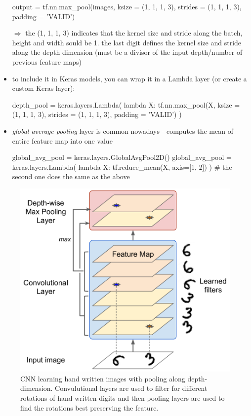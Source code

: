 \documentclass[12pt,a4paper]{article}
\begin{document}
\begin{itemize}
\begin{python}
    output = tf.nn.max_pool(images, 
                            ksize = (1, 1, 1, 3), 
                            strides = (1, 1, 1, 3), 
                            padding = 'VALID')
  \end{python}
  $\Longrightarrow$ the (1, 1, 1, 3) indicates that the kernel size and stride along the batch, height and width sould be 1. the last digit defines the kernel size and stride along the depth dimension (must be a divisor of the input depth/number of previous feature maps)
  \item to include it in Keras models, you can wrap it in a Lambda layer (or create a custom Keras layer):
  \begin{python}
    depth_pool = keras.layers.Lambda( lambda X: tf.nn.max_pool(X, 
                                          ksize = (1, 1, 1, 3), 
                                          strides = (1, 1, 1, 3), 
                                          padding = 'VALID') )
  \end{python}
  \item \textit{global average pooling} layer is common nowadays - computes the mean of entire feature map into one value
  \begin{python}
    global_avg_pool = keras.layers.GlobalAvgPool2D()
    global_avg_pool = keras.layers.Lambda( lambda X: tf.reduce_mean(X, 
                                          axis=[1, 2]) ) 
    # the second one does the same as the above
  \end{python}
\end{itemize}
\begin{figure}
  \centering
  \includegraphics[width=.5\linewidth]{Images/depth-pooling.png}
  \caption[CNN learning hand written images with pooling along depth-dimension]{CNN learning hand written images with pooling along depth-dimension. Convulutional layers are used to filter for different rotations of hand written digits and then pooling layers are used to find the rotations best preserving the feature.}
  \label{fig:pool-depth}
\end{figure}
\end{document}

